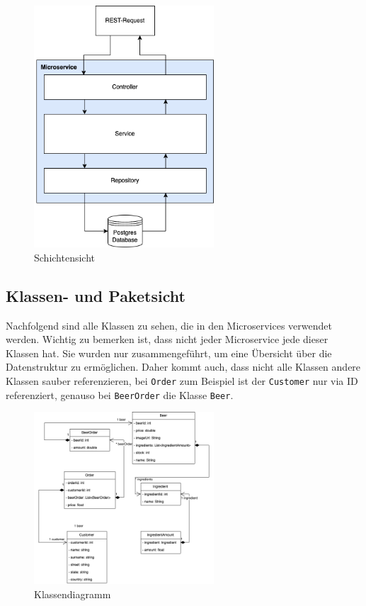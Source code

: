 \begin{figure}[H]
    \centering
    \includegraphics[width=0.6\textwidth]{../images/bausteinsicht/schichtensicht.png}
    \caption{Schichtensicht}
    \label{fig:schichtensicht}
\end{figure}

\subsection{Klassen- und Paketsicht}
\label{subsec:klassen-und-paketsicht}
Nachfolgend sind alle Klassen zu sehen, die in den Microservices verwendet werden. Wichtig zu bemerken ist, dass nicht jeder Microservice jede dieser Klassen hat. Sie wurden nur zusammengeführt, um eine Übersicht über die Datenstruktur
zu ermöglichen. Daher kommt auch, dass nicht alle Klassen andere Klassen sauber referenzieren, bei \texttt{Order} zum Beispiel ist der \texttt{Customer} nur via ID referenziert, genauso bei \texttt{BeerOrder} die Klasse \texttt{Beer}.
\begin{figure}[H]
    \centering
    \includegraphics[width=0.6\textwidth]{../images/bausteinsicht/klassendiagramm.png}
    \caption{Klassendiagramm}
    \label{fig:klassendiagramm}
\end{figure}

